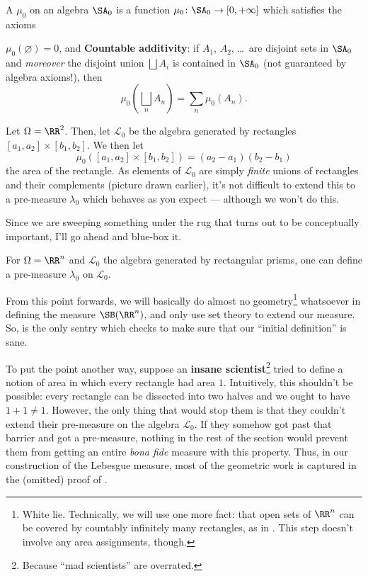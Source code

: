 \begin{definition}
	A  $\mu_0$ on an algebra $\SA_0$
	is a function $\mu_0 \colon \SA_0 \to [0, +\infty]$
	which satisfies the axioms
	\begin{itemize}
		\ii $\mu_0(\varnothing) = 0$, and
		\ii \textbf{Countable additivity}:
		if $A_1$, $A_2$, \dots\ are disjoint sets in $\SA_0$
		and \emph{moreover} the disjoint union $\bigsqcup A_i$
		is contained in $\SA_0$ (not guaranteed by algebra axioms!),
		then
		\[ \mu_0\left( \bigsqcup_n A_n \right) = \sum_n \mu_0(A_n). \]
	\end{itemize}
\end{definition}

\begin{example}
	Let $\Omega = \RR^2$.
	Then, let $\mathcal{L}_0$ be the algebra generated by rectangles
	$[a_1, a_2] \times [b_1, b_2]$.
	We then let
	\[ \mu_0\left( [a_1, a_2] \times [b_1, b_2] \right)
	= (a_2-a_1)(b_2-b_1) \]
	the area of the rectangle.
	As elements of $\mathcal{L}_0$ are simply \emph{finite} unions
	of rectangles and their complements (picture drawn earlier),
	it's not difficult to extend this to a pre-measure $\lambda_0$
	which behaves as you expect --- although we won't do this.
\end{example}

Since we are sweeping something under the rug that
turns out to be conceptually important,
I'll go ahead and blue-box it.
\begin{proposition}
	\label{prop:lebesgue_rectangle}
	For $\Omega = \RR^n$ and $\mathcal{L}_0$
	the algebra generated by rectangular prisms,
	one can define a pre-measure $\lambda_0$ on $\mathcal{L}_0$.
\end{proposition}
From this point forwards, we will basically do
almost no geometry\footnote{White lie.
	Technically, we will use one more fact:
	that open sets of $\RR^n$ can be covered by countably
	infinitely many rectangles,
	as in .
	This step doesn't involve any area assignments, though.}
whatsoever in defining the measure $\SB(\RR^n)$,
and only use set theory to extend our measure.
So,  is the only sentry
which checks to make sure that our ``initial definition'' is sane.

To put the point another way,
suppose an \textbf{insane scientist}\footnote{Because
	``mad scientists'' are overrated.}
tried to define a notion
of area in which every rectangle had area $1$.
Intuitively, this shouldn't be possible:
every rectangle can be dissected into two halves
and we ought to have $1+1 \neq 1$.
However, the only thing that would stop them is that they couldn't
extend their pre-measure on the algebra $\mathcal{L}_0$.
If they somehow got past that barrier and got a pre-measure,
nothing in the rest of the section would prevent them
from getting an entire \emph{bona fide} measure with this property.
Thus, in our construction of the Lebesgue measure,
most of the geometric work is captured in the (omitted) proof
of .

